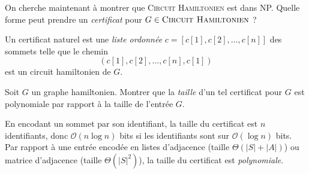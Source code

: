 \begin{exercice}[\textsc{Circuit Hamiltonien} est NP-complet%
    \footnote{Vidéo détaillée de la réduction de \textsc{3-SAT} à \textsc{Cycle Hamiltonien} : \url{https://www.youtube.com/watch?v=OHnX-R_SBpM}}]
\begin{corrections}
\begin{center}
    \end{center}
  \end{corrections}

  
  \begin{questions}
  \item On cherche maintenant à montrer que \textsc{Circuit Hamiltonien} est dans NP.
    Quelle forme peut prendre un \emph{certificat} pour $G \in \textsc{Circuit Hamiltonien}$ ?
  \end{questions}
  \begin{corrections}
    Un certificat naturel est une \emph{liste ordonnée} $c = [c[1], c[2], \dots, c[n]]$ des sommets telle que le chemin
    $$(c[1], c[2], \dots, c[n], c[1])$$
    est un circuit hamiltonien de $G$. 
  \end{corrections}

  \begin{questions}
  \item Soit $G$ un graphe hamiltonien. Montrer que la \emph{taille} d'un tel certificat pour $G$
    est polynomiale par rapport à la taille de l'entrée $G$.
  \end{questions}
  \begin{corrections}
    En encodant un sommet par son identifiant, la taille du certificat est $n$ identifiants,
    donc $\mathcal{O}(n\log n)$ bits si les identifiants sont sur $\mathcal{O}(\log n)$ bits.
    Par rapport à une entrée encodée en listes d'adjacence (taille $\Theta(|S| + |A|)$)
    ou matrice d'adjacence (taille $\Theta(|S|^2)$), la taille du certificat est \emph{polynomiale}.
  \end{corrections}


\end{exercice}
